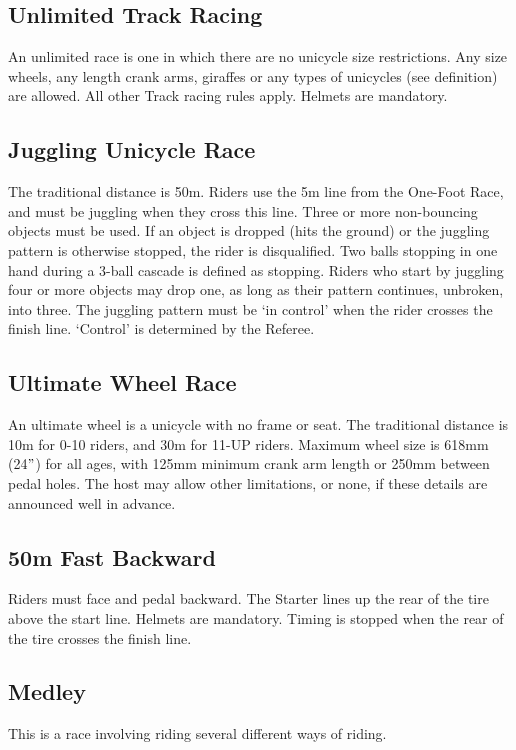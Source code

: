 \subsection{Unlimited Track Racing}
An unlimited race is one in which there are no unicycle size restrictions.
Any size wheels, any length crank arms, giraffes or any types of unicycles (see definition) are allowed.
All other Track racing rules apply.
Helmets are mandatory.

\subsection{Juggling Unicycle Race}
The traditional distance is 50m.
Riders use the 5m line from the One-Foot Race, and must be juggling when they cross this line.
Three or more non-bouncing objects must be used.
If an object is dropped (hits the ground) or the juggling pattern is otherwise stopped, the rider is disqualified.
Two balls stopping in one hand during a 3-ball cascade is defined as stopping.
Riders who start by juggling four or more objects may drop one, as long as their pattern continues, unbroken, into three.
The juggling pattern must be ‘in control' when the rider crosses the finish line.
‘Control' is determined by the Referee.

\subsection{Ultimate Wheel Race}
An ultimate wheel is a unicycle with no frame or seat.
The traditional distance is 10m for 0-10 riders, and 30m for 11-UP riders.
Maximum wheel size is 618mm (24$"$) for all ages, with 125mm minimum crank arm length or 250mm between pedal holes.
The host may allow other limitations, or none, if these details are announced well in advance.

\subsection{50m Fast Backward}
Riders must face and pedal backward.
The Starter lines up the rear of the tire above the start line.
Helmets are mandatory.
Timing is stopped when the rear of the tire crosses the finish line.

\subsection{Medley}
This is a race involving riding several different ways of riding.

